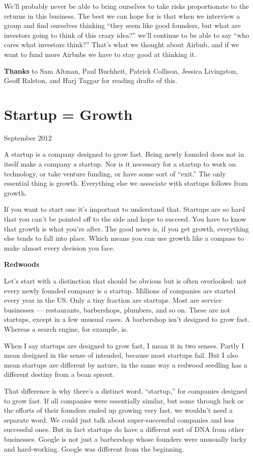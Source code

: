 \documentclass[12pt]{book}
\begin{document}
We'll probably never be able to bring ourselves to take risks
proportionate to the returns in this business. The best we can hope for
is that when we interview a group and find ourselves thinking ``they
seem like good founders, but what are investors going to think of this
crazy idea?'' we'll continue to be able to say ``who cares what
investors think?'' That's what we thought about Airbnb, and if we want
to fund more Airbnbs we have to stay good at thinking it.


\textbf{Thanks} to Sam Altman, Paul Buchheit, Patrick Collison, Jessica
Livingston, Geoff Ralston, and Harj Taggar for reading drafts of this.
\chapter{Startup = Growth}

September 2012

A startup is a company designed to grow fast. Being newly founded does
not in itself make a company a startup. Nor is it necessary for a
startup to work on technology, or take venture funding, or have some
sort of ``exit.'' The only essential thing is growth. Everything else we
associate with startups follows from growth.

If you want to start one it's important to understand that. Startups are
so hard that you can't be pointed off to the side and hope to succeed.
You have to know that growth is what you're after. The good news is, if
you get growth, everything else tends to fall into place. Which means
you can use growth like a compass to make almost every decision you
face.

\textbf{Redwoods}

Let's start with a distinction that should be obvious but is often
overlooked: not every newly founded company is a startup. Millions of
companies are started every year in the US. Only a tiny fraction are
startups. Most are service businesses --- restaurants, barbershops,
plumbers, and so on. These are not startups, except in a few unusual
cases. A barbershop isn't designed to grow fast. Whereas a search
engine, for example, is.

When I say startups are designed to grow fast, I mean it in two senses.
Partly I mean designed in the sense of intended, because most startups
fail. But I also mean startups are different by nature, in the same way
a redwood seedling has a different destiny from a bean sprout.

That difference is why there's a distinct word, ``startup,'' for
companies designed to grow fast. If all companies were essentially
similar, but some through luck or the efforts of their founders ended up
growing very fast, we wouldn't need a separate word. We could just talk
about super-successful companies and less successful ones. But in fact
startups do have a different sort of DNA from other businesses. Google
is not just a barbershop whose founders were unusually lucky and
hard-working. Google was different from the beginning.
\end{document}
